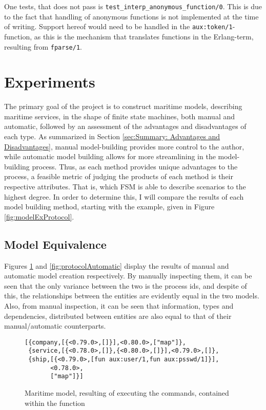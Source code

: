 One tests, that does not pass is \lstinline{test_interp_anonymous_function/0}. This is due to the fact that handling of anonymous functions is not implemented at the time of writing. Support hereof would need to be handled in the \linebreak \lstinline{aux:token/1}-function, as this is the mechanism that translates functions in the Erlang-term, resulting from \lstinline{fparse/1}.

\section{Experiments}

The primary goal of the project is to construct maritime models, describing maritime services, in the shape of finite state machines, both manual and automatic, followed by an assessment of the advantages and disadvantages of each type. As summarized in Section \ref{sec:Summary: Advantages and Disadvantages}, manual model-building provides more control to the author, while automatic model building allows for more streamlining in the model-building process. Thus, as each method provides unique advantages to the process, a feasible metric of judging the products of each method is their respective attributes. That is, which FSM is able to describe scenarios to the highest degree. In order to determine this, I will compare the results of each model building method, starting with the example, given in Figure \ref{fig:modelExProtocol}.

\subsection{Model Equivalence}

Figures \ref{fig:protocolManual} and \ref{fig:protocolAutomatic} display the results of manual and automatic model creation respectively. By manually inspecting them, it can be seen that the only variance between the two is the process ids, and despite of this, the relationships between the entities are evidently equal in the two models. Also, from manual inspection, it can be seen that information, types and dependencies, distributed between entities are also equal to that of their manual/automatic counterparts.

\begin{figure}[h]
  \begin{lstlisting}[keywordstyle={}]
[{company,[{<0.79.0>,[]}],<0.80.0>,["map"]},
 {service,[{<0.78.0>,[]},{<0.80.0>,[]}],<0.79.0>,[]},
 {ship,[{<0.79.0>,[fun aux:user/1,fun aux:psswd/1]}],
       <0.78.0>,
       ["map"]}]
  \end{lstlisting}
  \caption{Maritime model, resulting of executing the commands, contained within the function }
  \label{fig:protocolManual}
\end{figure}

